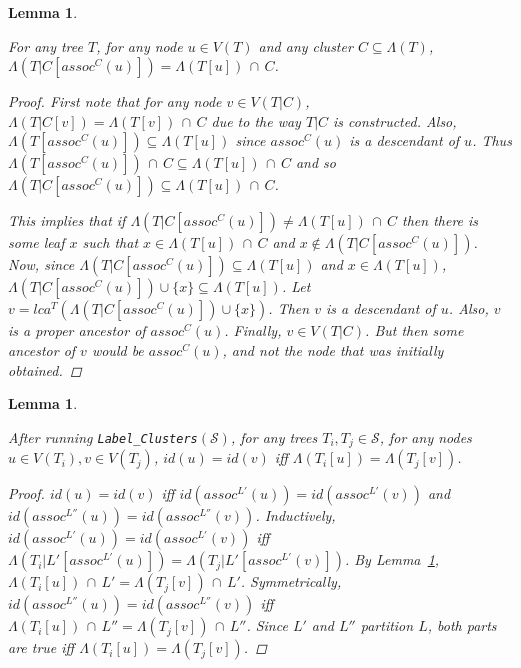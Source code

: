 \documentclass{article}
\newcommand{\leafset}{\Lambda}
\newtheorem{assocnode}[incompatibility]{Lemma}
\newtheorem{labelclusterscorrectness}[incompatibility]{Lemma}
\begin{document}
    \bigskip
    \begin{assocnode}
        \label{lem:assocnode}

        For any tree $T$, for any node $u \in V(T)$ and any cluster $C \subseteq \leafset(T)$, $\leafset(T|C[assoc^C(u)]) = \leafset(T[u])\, \cap\, C$.

        \begin{proof}
            First note that for any node $v \in V(T|C)$, $\leafset(T|C[v]) = \leafset(T[v])\, \cap\, C$ due to the way $T|C$ is constructed. Also, $\leafset(T[assoc^C(u)]) \subseteq \leafset(T[u])$ since $assoc^C(u)$ is a descendant of $u$. Thus $\leafset(T[assoc^C(u)])\, \cap\, C \subseteq \leafset(T[u])\, \cap\, C$ and so $\leafset(T|C[assoc^C(u)]) \subseteq \leafset(T[u])\, \cap\, C$.

            This implies that if $\leafset(T|C[assoc^C(u)]) \neq \leafset(T[u])\, \cap\, C$ then there is some leaf $x$ such that $x \in \leafset(T[u])\, \cap\, C$ and $x \not\in \leafset(T|C[assoc^C(u)])$. Now, since $\leafset(T|C[assoc^C(u)]) \subseteq \leafset(T[u])$ and $x \in \leafset(T[u])$, $\leafset(T|C[assoc^C(u)]) \cup \{x\} \subseteq \leafset(T[u])$. Let $v = lca^T(\leafset(T|C[assoc^C(u)]) \cup \{x\})$. Then $v$ is a descendant of $u$. Also, $v$ is a proper ancestor of $assoc^C(u)$. Finally, $v \in V(T|C)$. But then some ancestor of $v$ would be $assoc^C(u)$, and not the node that was initially obtained.
        \end{proof}
    \end{assocnode}

    \medskip
    \begin{labelclusterscorrectness}
        \label{lem:labelclusterscorrectness}

        After running \texttt{Label\_Clusters}$(\mathcal{S})$, for any trees $T_i, T_j \in \mathcal{S}$, for any nodes $u \in V(T_i), v \in V(T_j)$, $id(u) = id(v)$ iff $\leafset(T_i[u]) = \leafset(T_j[v])$.

        \begin{proof}
            $id(u) = id(v)$ iff $id(assoc^{L'}(u)) = id(assoc^{L'}(v))$ and $id(assoc^{L''}(u)) = id(assoc^{L''}(v))$. Inductively, $id(assoc^{L'}(u)) = id(assoc^{L'}(v))$ iff $\leafset(T_i|L'[assoc^{L'}(u)]) = \leafset(T_j|L'[assoc^{L'}(v)])$. By Lemma~\ref{lem:assocnode}, $\leafset(T_i[u])\, \cap\, L' = \leafset(T_j[v])\, \cap\, L'$. Symmetrically, $id(assoc^{L''}(u)) = id(assoc^{L''}(v))$ iff $\leafset(T_i[u])\, \cap\, L'' = \leafset(T_j[v])\, \cap\, L''$. Since $L'$ and $L''$ partition $L$, both parts are true iff $\leafset(T_i[u]) = \leafset(T_j[v])$.
        \end{proof}
    \end{labelclusterscorrectness}
\end{document}
